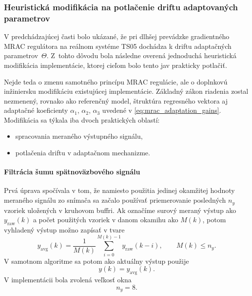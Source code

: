 \subsubsection{Heuristická modifikácia na potlačenie driftu adaptovaných parametrov}
\label{sec:mrac_cpp_heuristic_modification}

V predchádzajúcej časti bolo ukázané, že pri dlhšej prevádzke gradientného
MRAC regulátora na reálnom systéme TS05 dochádza k driftu adaptačných
parametrov~$\Theta$. Z~tohto dôvodu bola následne overená jednoduchá
heuristická modifikácia implementácie, ktorej cieľom bolo tento jav
prakticky potlačiť.

Nejde teda o zmenu samotného princípu MRAC regulácie, ale o doplnkovú
inžiniersku modifikáciu existujúcej implementácie.
Základný zákon riadenia zostal nezmenený, rovnako ako referenčný model,
štruktúra regresného vektora aj adaptačné koeficienty
$\alpha_1$, $\alpha_2$, $\alpha_3$ uvedené v \eqref{eq:mrac_adaptation_gains}.
Modifikácia sa týkala iba dvoch praktických oblastí:
\begin{itemize}[leftmargin=0pt, labelsep=3mm, itemsep=0pt]
    \item spracovania meraného výstupného signálu,
    \item potlačenia driftu v adaptačnom mechanizme.
\end{itemize}


\paragraph{Filtrácia šumu spätnoväzbového signálu}

Prvá úprava spočívala v tom, že namiesto použitia jedinej okamžitej hodnoty
meraného signálu zo snímača sa začalo používať priemerovanie posledných
$n_y$ vzoriek uložených v kruhovom buffri.
Ak označíme surový meraný výstup ako $y_{\mathrm{raw}}(k)$ a počet použitých vzoriek
v danom okamihu ako $M(k)$, potom vyhladený výstup možno zapísať v tvare
\begin{equation}
    y_{\mathrm{avg}}(k) =
    \frac{1}{M(k)}
    \sum_{i=0}^{M(k)-1}
    y_{\mathrm{raw}}(k-i),
    \qquad
    M(k) \leq n_y.
    \label{eq:mrac_cpp_yavg}
\end{equation}
V samotnom algoritme sa potom ako aktuálny výstup použije
\begin{equation}
    y(k) = y_{\mathrm{avg}}(k).
    \label{eq:mrac_cpp_yavg_used}
\end{equation}
V implementácii bola zvolená veľkosť okna
\begin{equation}
    n_y = 8.
    \label{eq:mrac_cpp_avg_window}
\end{equation}

